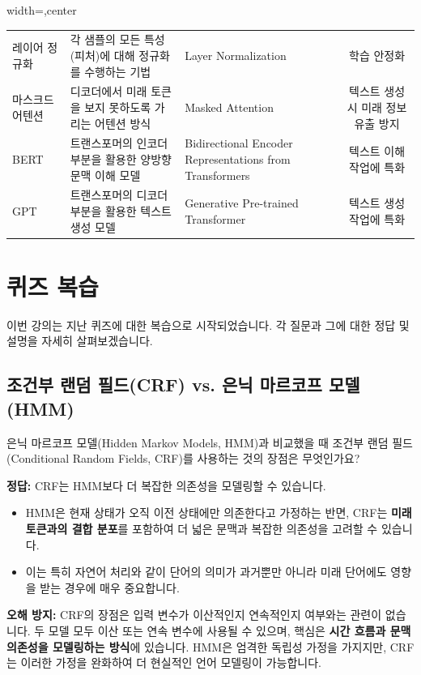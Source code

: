 \documentclass[11pt,a4paper]{article}
\theoremstyle{definition}
\begin{document}
\begin{adjustbox}{width=\textwidth,center}
\begin{tabular}{lllc}
레이어 정규화 & 각 샘플의 모든 특성(피처)에 대해 정규화를 수행하는 기법 & Layer Normalization & 학습 안정화 \\
마스크드 어텐션 & 디코더에서 미래 토큰을 보지 못하도록 가리는 어텐션 방식 & Masked Attention & 텍스트 생성 시 미래 정보 유출 방지 \\
BERT & 트랜스포머의 인코더 부분을 활용한 양방향 문맥 이해 모델 & Bidirectional Encoder Representations from Transformers & 텍스트 이해 작업에 특화 \\
GPT & 트랜스포머의 디코더 부분을 활용한 텍스트 생성 모델 & Generative Pre-trained Transformer & 텍스트 생성 작업에 특화 \\
\bottomrule
\end{tabular}
\end{adjustbox}

\newpage
\section{퀴즈 복습}
이번 강의는 지난 퀴즈에 대한 복습으로 시작되었습니다. 각 질문과 그에 대한 정답 및 설명을 자세히 살펴보겠습니다.

\subsection{조건부 랜덤 필드(CRF) vs. 은닉 마르코프 모델(HMM)}
\begin{tcolorbox}[mybox, title={질문 1: CRF의 장점}]
은닉 마르코프 모델(Hidden Markov Models, HMM)과 비교했을 때 조건부 랜덤 필드(Conditional Random Fields, CRF)를 사용하는 것의 장점은 무엇인가요?
\end{tcolorbox}

\begin{tcolorbox}[summary, title={정답 및 설명}]
\textbf{정답:} CRF는 HMM보다 더 복잡한 의존성을 모델링할 수 있습니다.
\begin{itemize}
    \item HMM은 현재 상태가 오직 이전 상태에만 의존한다고 가정하는 반면, CRF는 \textbf{미래 토큰과의 결합 분포}를 포함하여 더 넓은 문맥과 복잡한 의존성을 고려할 수 있습니다.
    \item 이는 특히 자연어 처리와 같이 단어의 의미가 과거뿐만 아니라 미래 단어에도 영향을 받는 경우에 매우 중요합니다.
\end{itemize}
\textbf{오해 방지:} CRF의 장점은 입력 변수가 이산적인지 연속적인지 여부와는 관련이 없습니다. 두 모델 모두 이산 또는 연속 변수에 사용될 수 있으며, 핵심은 \textbf{시간 흐름과 문맥 의존성을 모델링하는 방식}에 있습니다. HMM은 엄격한 독립성 가정을 가지지만, CRF는 이러한 가정을 완화하여 더 현실적인 언어 모델링이 가능합니다.
\end{tcolorbox}
\end{document}
